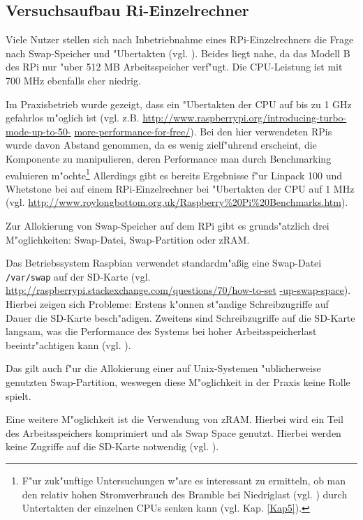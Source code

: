 \subsection{Versuchsaufbau Ri-Einzelrechner}\label{RPi-Versuchsaufbau}

Viele Nutzer stellen sich nach Inbetriebnahme eines RPi-Einzelrechners die Frage nach Swap-Speicher und "Ubertakten (vgl. \cite{pow12}). Beides liegt nahe, da das Modell B des RPi nur "uber 512 MB Arbeitsspeicher verf"ugt. Die CPU-Leistung ist mit 700 MHz ebenfalls eher niedrig. 

Im Praxisbetrieb wurde gezeigt, dass ein "Ubertakten der CPU auf bis zu 1 GHz gefahrlos m"oglich ist (vgl. z.B. \url{http://www.raspberrypi.org/introducing-turbo-mode-up-to-50-} \url{more-performance-for-free/}). Bei den hier verwendeten RPis wurde davon Abstand genommen, da es wenig zielf"uhrend erscheint, die Komponente zu manipulieren, deren Performance man durch Benchmarking evaluieren m"ochte\footnote{F"ur zuk"unftige Untersuchungen w"are es interessant zu ermitteln, ob man den relativ hohen Stromverbrauch des Bramble bei Niedriglast (vgl. \cite{kli13}) durch Untertakten der einzelnen CPUs senken kann (vgl. Kap. \ref{Kap5}).} Allerdings gibt es bereits Ergebnisse f"ur Linpack 100 und Whetstone bei auf einem RPi-Einzelrechner bei "Ubertakten der CPU auf 1 MHz (vgl. \url{http://www.roylongbottom.org.uk/Raspberry\%20Pi\%20Benchmarks.htm}).

Zur Allokierung von Swap-Speicher auf dem RPi gibt es grunds"atzlich drei M"oglichkeiten: Swap-Datei, Swap-Partition oder zRAM. 

Das Betriebssystem Raspbian verwendet standardm"a\ss ig eine Swap-Datei \texttt{/var/swap} auf der SD-Karte (vgl. \url{http://raspberrypi.stackexchange.com/questions/70/how-to-set} \url{-up-swap-space}). Hierbei zeigen sich Probleme: Erstens k"onnen st"andige Schreibzugriffe auf Dauer die SD-Karte besch"adigen. Zweitens sind Schreibzugriffe auf die SD-Karte langsam, was die Performance des Systems bei hoher Arbeitsspeicherlast beeintr"achtigen kann (vgl. \cite{pow12}). 

Das gilt auch f"ur die Allokierung einer auf Unix-Systemen "ublicherweise genutzten Swap-Partition, weswegen diese M"oglichkeit in der Praxis keine Rolle spielt. 

Eine weitere M"oglichkeit ist die Verwendung von zRAM. Hierbei wird ein Teil des Arbeitsspeichers komprimiert und als Swap Space genutzt. Hierbei werden keine Zugriffe auf die SD-Karte notwendig (vgl. \cite{pow12}). 

